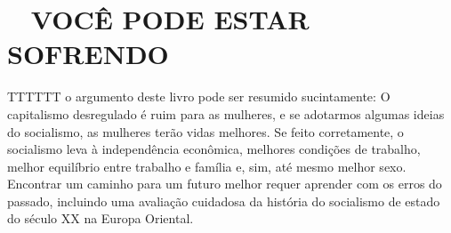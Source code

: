 \chapter{~ VOCÊ PODE ESTAR SOFRENDO}\label{~ VOCÊ PODE ESTAR SOFRENDO}
 \par 
TTTTTT o argumento deste livro pode ser resumido sucintamente: O capitalismo desregulado é ruim para as mulheres, e se adotarmos algumas ideias do socialismo, as mulheres terão vidas melhores. Se feito corretamente, o socialismo leva à independência econômica, melhores condições de trabalho, melhor equilíbrio entre trabalho e família e, sim, até mesmo melhor sexo. Encontrar um caminho para um futuro melhor requer aprender com os erros do passado, incluindo uma avaliação cuidadosa da história do socialismo de estado do século XX na Europa Oriental.
 \par 

